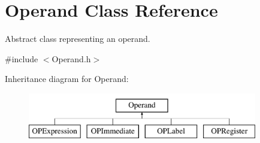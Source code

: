 \hypertarget{class_operand}{\section{Operand Class Reference}
\label{class_operand}
}


Abstract class representing an operand.  




{\ttfamily \#include $<$Operand.\-h$>$}

Inheritance diagram for Operand\-:\begin{figure}[H]
\begin{center}
\leavevmode
\includegraphics[height=2.000000cm]{class_operand}
\end{center}
\end{figure}
